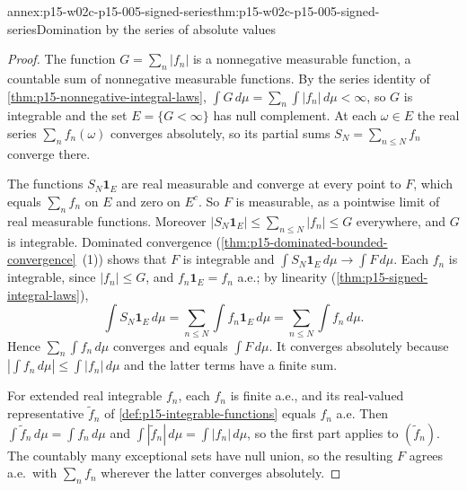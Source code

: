 \begin{annexitem}{annex:p15-w02c-p15-005-signed-series}{thm:p15-w02c-p15-005-signed-series}{Domination by the series of absolute values}
\begin{proof}
The function \(G=\sum_n|f_n|\) is a nonnegative measurable function, a
countable sum of nonnegative measurable functions. By the series
identity of \cref{thm:p15-nonnegative-integral-laws},
\(\int G\,d\mu=\sum_n\int|f_n|\,d\mu<\infty\), so \(G\) is integrable
and the set \(E=\{G<\infty\}\) has null complement. At each
\(\omega\in E\) the real series \(\sum_nf_n(\omega)\) converges
absolutely, so its partial sums \(S_N=\sum_{n\leq N}f_n\) converge
there.

The functions \(S_N\mathbf1_E\) are real measurable and converge at
every point to \(F\), which equals \(\sum_nf_n\) on \(E\) and zero on
\(E^c\). So \(F\) is measurable, as a pointwise limit of real measurable
functions. Moreover
\(|S_N\mathbf1_E|\leq\sum_{n\leq N}|f_n|\leq G\) everywhere, and \(G\)
is integrable. Dominated convergence
(\cref{thm:p15-dominated-bounded-convergence}~(1)) shows that \(F\) is
integrable and \(\int S_N\mathbf1_E\,d\mu\to\int F\,d\mu\). Each
\(f_n\) is integrable, since \(|f_n|\leq G\), and \(f_n\mathbf1_E=f_n\)
a.e.; by linearity (\cref{thm:p15-signed-integral-laws}),
\[
 \int S_N\mathbf1_E\,d\mu=\sum_{n\leq N}\int f_n\mathbf1_E\,d\mu
 =\sum_{n\leq N}\int f_n\,d\mu .
\]
Hence \(\sum_n\int f_n\,d\mu\) converges and equals \(\int F\,d\mu\).
It converges absolutely because
\(\left|\int f_n\,d\mu\right|\leq\int|f_n|\,d\mu\) and the latter terms
have a finite sum.

For extended real integrable \(f_n\), each \(f_n\) is finite a.e., and
its real-valued representative \(\tilde f_n\) of
\cref{def:p15-integrable-functions} equals \(f_n\) a.e. Then
\(\int\tilde f_n\,d\mu=\int f_n\,d\mu\) and
\(\int|\tilde f_n|\,d\mu=\int|f_n|\,d\mu\), so the first part applies to
\((\tilde f_n)\). The countably many exceptional sets have null union,
so the resulting \(F\) agrees a.e.\ with \(\sum_nf_n\) wherever the
latter converges absolutely.
\end{proof}
\end{annexitem}

